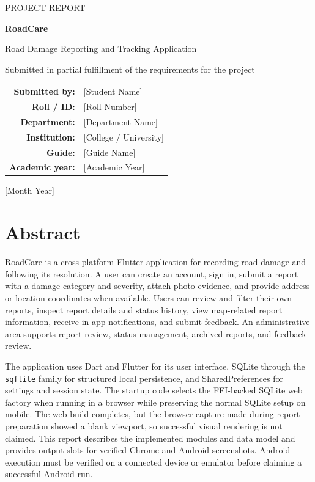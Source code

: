 \documentclass[12pt,a4paper]{report}
\begin{document}
\begin{titlepage}
  \centering
  \vspace*{22mm}
  {\Large PROJECT REPORT\par}
  \vspace{16mm}
  {\Huge\bfseries\color{roadblue} RoadCare\par}
  \vspace{5mm}
  {\Large Road Damage Reporting and Tracking Application\par}
  \vspace{18mm}
  {\large Submitted in partial fulfillment of the requirements for the project\par}
  \vfill
  \begin{tabular}{rl}
    \textbf{Submitted by:} & [Student Name] \\
    \textbf{Roll / ID:} & [Roll Number] \\
    \textbf{Department:} & [Department Name] \\
    \textbf{Institution:} & [College / University] \\
    \textbf{Guide:} & [Guide Name] \\
    \textbf{Academic year:} & [Academic Year]
  \end{tabular}
  \vfill
  {\large [Month Year]\par}
\end{titlepage}

\chapter*{Abstract}
RoadCare is a cross-platform Flutter application for recording road damage and following its resolution. A user can create an account, sign in, submit a report with a damage category and severity, attach photo evidence, and provide address or location coordinates when available. Users can review and filter their own reports, inspect report details and status history, view map-related report information, receive in-app notifications, and submit feedback. An administrative area supports report review, status management, archived reports, and feedback review.

The application uses Dart and Flutter for its user interface, SQLite through the \texttt{sqflite} family for structured local persistence, and SharedPreferences for settings and session state. The startup code selects the FFI-backed SQLite web factory when running in a browser while preserving the normal SQLite setup on mobile. The web build completes, but the browser capture made during report preparation showed a blank viewport, so successful visual rendering is not claimed. This report describes the implemented modules and data model and provides output slots for verified Chrome and Android screenshots. Android execution must be verified on a connected device or emulator before claiming a successful Android run.
\end{document}
